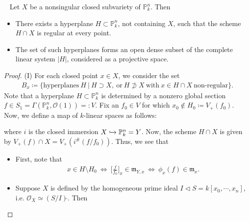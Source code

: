 \documentclass[11pt,a4paper,footinclude=true,headinclude=true]{scrbook} %
\newcommand{\acton}{\rotatebox{180}{$\,\circlearrowright$}}
\newcommand{\OO}{\mathcal{O}}
\newcommand{\PP}{\mathbb{P}}
\newcommand{\mm}{\mathfrak{m}}
\newcommand{\<}{\langle}
\newcommand{\>}{\rangle}
\newcommand\Comm[2][\acton]{%
  \arrow[mysymbol]{#2}[description]{#1}}
\newenvironment{theorem}[2][]
{\renewcommand\theinnercustomthm{#2}\innercustomthm[#1]
\begin{mdframed}[backgroundcolor=yellow!20]\ }
{\end{mdframed}\endinnercustomthm}
\begin{document}
\begin{theorem}{8.18. (Bertini Theorem)}
    \newline Let $X$ be a nonsingular closed subvariety of $\PP_k^n$. Then 
    \begin{itemize}
        \item[(i)] There exists a hyperplane $H\subset\PP_k^n$, not containing $X$, such that the scheme $H\cap X$ is regular at every point.
        \item[(ii)] The set of such hyperplanes forms an open dense subset of the complete linear system $|H|$, considered as a projective space.
    \end{itemize}
\end{theorem}
\begin{proof}
    (I) For each closed point $x\in X$, we consider the set
    \begin{align*}
        B_x\coloneqq\{\text{hyperplanes}\ H\ |\ H\supset X,\ \text{or}\ H\not\supset X\ \text{with}\ x\in H\cap X\ \text{non-regular}\}.
    \end{align*}
    Note that a hyperplane $H\subset\PP_k^n$ is determined by a nonzero global section $f\in S_1=\Gamma(\PP_k^n,\OO(1))=:V$. Fix an $f_0\in V$ for which $x_0\notin H_0\coloneqq V_+(f_0)$. Now, we define a map of $k$-linear spaces as follows:
    \begin{center}
    \end{center}
    where $i$ is the closed immersion $X\xhookrightarrow{}\PP_k^n=Y$. Now, the scheme $H\cap X$ is given by $V_+(f)\cap X=V_+(i^\#(f/f_0))$. Thus, we see that
    \begin{itemize}
        \item First, note that 
        \begin{align*}
            x\in H\setminus H_0\ \Longleftrightarrow\ \Big[\frac{f}{f_0}\Big]_x\in\mm_{Y,x}\ \Longleftrightarrow\ \phi_x(f)\in\mm_x.
        \end{align*}
        \item Suppose $X$ is defined by the homogeneous prime ideal $I\triangleleft S=k[x_0,\cdots,x_n]$, i.e. $\OO_X\simeq(S/I)\widetilde{}$. Then 

\end{itemize}
\end{proof}
\end{document}
